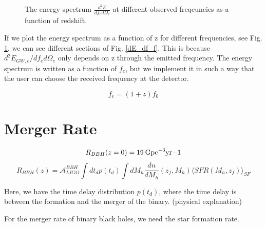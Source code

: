 \begin{figure}
  
    \caption{The energy spectrum $\frac{d^2E}{df_e d\Omega_e}$ at different observed freqeuncies as a function of redshift.}
    \label{dE_df_diff_frequencies}
\end{figure}

If we plot the energy spectrum as a function of z for different frequencies, see Fig. \ref{dE_df_diff_frequencies}, we can see different sections of Fig. \ref{dE_df_f}. This is because $d^2 E_{GW,e}/df_e d\Omega_e$ only depends on z through the emitted frequency. The energy spectrum is written as a function of $f_e$, but we implement it in such a way that the user can choose the received frequency at the detector.


\begin{equation}
    f_e = (1+z)f_0
\end{equation}

\section{Merger Rate}
\begin{equation}
    R_{BBH}(z=0) = 19 \:\rm{Gpc}^{-3}\rm{yr}{-1}
\end{equation}
\begin{equation}
    R_{BBH}(z)=\mathcal{A}_{LIGO}^{BBH}\int dt_d p(t_d) \int dM_h \frac{dn}{dM_h}(z_f, M_h)\langle SFR(M_h, z_f)\rangle_{SF}
    \label{BBH_merger_equation}
\end{equation}

Here, we have the time delay distribution $p(t_d)$, where the time delay is between the formation and the merger of the binary. (physical explanation)

For the merger rate of binary black holes, we need the star formation rate. 

